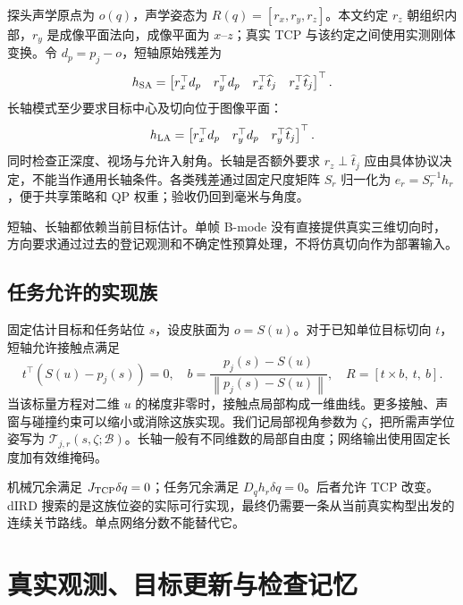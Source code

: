\documentclass[UTF8,11pt,a4paper,fontset=fandol]{ctexart}
\numberwithin{equation}{section}
\theoremstyle{definition}
\newcommand{\norm}[1]{\left\lVert#1\right\rVert}
\begin{document}
探头声学原点为 $o(q)$，声学姿态为 $R(q)=[r_x,r_y,r_z]$。本文约定 $r_z$ 朝组织内部，$r_y$ 是成像平面法向，成像平面为 $x$--$z$；真实 TCP 与该约定之间使用实测刚体变换。令 $d_p=p_j-o$，短轴原始残差为
\begin{equation}
h_{\rm SA}=
\begin{bmatrix}
r_x^\top d_p & r_y^\top d_p &
r_x^\top\widehat t_j & r_z^\top\widehat t_j
\end{bmatrix}^{\top}.
\label{eq:sa}
\end{equation}
长轴模式至少要求目标中心及切向位于图像平面：
\begin{equation}
h_{\rm LA}=
\begin{bmatrix}
r_x^\top d_p & r_y^\top d_p & r_y^\top\widehat t_j
\end{bmatrix}^{\top}.
\label{eq:la}
\end{equation}
同时检查正深度、视场与允许入射角。长轴是否额外要求 $r_z\perp\widehat t_j$ 应由具体协议决定，不能当作通用长轴条件。各类残差通过固定尺度矩阵 $S_r$ 归一化为 $e_r=S_r^{-1}h_r$，便于共享策略和 QP 权重；验收仍回到毫米与角度。

短轴、长轴都依赖当前目标估计。单帧 B-mode 没有直接提供真实三维切向时，方向要求通过过去的登记观测和不确定性预算处理，不将仿真切向作为部署输入。

\subsection{任务允许的实现族}
固定估计目标和任务站位 $s$，设皮肤面为 $o=S(u)$。对于已知单位目标切向 $t$，短轴允许接触点满足
\begin{equation}
t^\top(S(u)-p_j(s))=0,\quad
b=\frac{p_j(s)-S(u)}{\norm{p_j(s)-S(u)}},\quad
R=[t\times b,\ t,\ b].
\label{eq:viewfamily}
\end{equation}
当该标量方程对二维 $u$ 的梯度非零时，接触点局部构成一维曲线。更多接触、声窗与碰撞约束可以缩小或消除这族实现。我们记局部视角参数为 $\zeta$，把所需声学位姿写为 $\mathcal T_{j,r}(s,\zeta;\mathcal B)$。长轴一般有不同维数的局部自由度；网络输出使用固定长度加有效维掩码。

机械冗余满足 $J_{\rm TCP}\delta q=0$；任务冗余满足 $D_qh_r\delta q=0$。后者允许 TCP 改变。dIRD 搜索的是这族位姿的实际可行实现，最终仍需要一条从当前真实构型出发的连续关节路线。单点网络分数不能替代它。

\section{真实观测、目标更新与检查记忆}
\label{sec:evidence}
\end{document}
